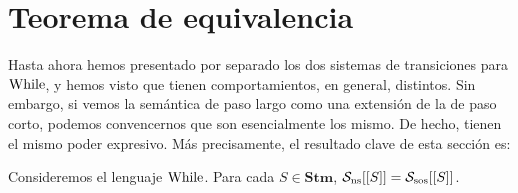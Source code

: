 \section{Teorema de equivalencia}

Hasta ahora hemos presentado por separado los dos sistemas de transiciones para $\mathrm{While}$, y hemos visto que tienen comportamientos, en general, distintos. Sin embargo, si vemos la semántica de paso largo como una extensión de la de paso corto, podemos convencernos que son esencialmente los mismo. De hecho, tienen el mismo poder expresivo. Más precisamente, el resultado clave de esta sección es:

\begin{theorem}[De equivalencia]\label{theq}
Consideremos el lenguaje $\mathrm{While}$. Para cada $S \in \mathbf{Stm}$, $\mathcal{S}_{\mathrm{ns}}[[S]] = \mathcal{S}_{\mathrm{sos}}[[S]]$.
\end{theorem}
